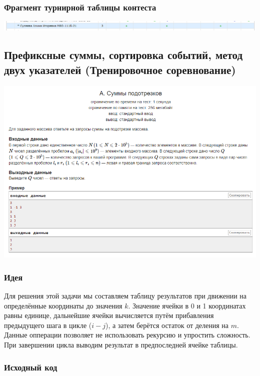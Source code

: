\subsubsection*{Фрагмент турнирной таблицы контеста}
\begin{center} 
\includegraphics[scale=0.5]{standings/7.png}\newline\noindent
\end{center} 
\pagebreak

\subsection*{Префиксные суммы, сортировка событий, метод двух указателей (Тренировочное соревнование)}
\begin{center} 
\includegraphics[scale=0.75]{statements/8_A.png}
\end{center} 
\subsubsection*{Идея}
Для решения этой задачи мы составляем таблицу результатов при движении на определённые координаты до значения $k$.
Значение ячейки в 0 и 1 координатах равны единице, дальнейшие ячейки вычисляется путём прибавления предыдущего шага в цикле ($i - j$), а затем берётся остаток от деления на $m$. Данные опперации позволяет не использовать рекурсию и упростить сложность. При завершении цикла выводим результат в предпоследней ячейке таблицы.
\subsubsection*{Исходный код}



